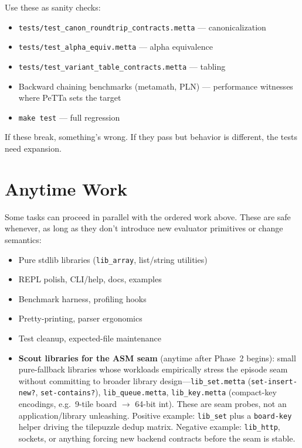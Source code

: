 \documentclass[11pt]{article}
\newcommand{\code}[1]{\texttt{#1}}
\newcommand{\PeTTa}{\textup{PeTTa}}
\begin{document}
Use these as sanity checks:
\begin{itemize}
\item \code{tests/test\_canon\_roundtrip\_contracts.metta} --- canonicalization
\item \code{tests/test\_alpha\_equiv.metta} --- alpha equivalence
\item \code{tests/test\_variant\_table\_contracts.metta} --- tabling
\item Backward chaining benchmarks (metamath, PLN) --- performance witnesses
  where \PeTTa{} sets the target
\item \code{make test} --- full regression
\end{itemize}

If these break, something's wrong.  If they pass but behavior is
different, the tests need expansion.

\section{Anytime Work}

Some tasks can proceed in parallel with the ordered work above.
These are safe whenever, as long as they don't introduce new
evaluator primitives or change semantics:

\begin{itemize}
\item Pure stdlib libraries (\code{lib\_array}, list/string utilities)
\item REPL polish, CLI/help, docs, examples
\item Benchmark harness, profiling hooks
\item Pretty-printing, parser ergonomics
\item Test cleanup, expected-file maintenance
\item \textbf{Scout libraries for the ASM seam} (anytime after
  Phase~2 begins): small pure-fallback libraries whose workloads
  empirically stress the episode seam without committing to broader
  library design---\code{lib\_set.metta} (\code{set-insert-new?},
  \code{set-contains?}), \code{lib\_queue.metta},
  \code{lib\_key.metta} (compact-key encodings, e.g.\ 9-tile board
  $\rightarrow$ 64-bit int).  These are seam probes, not an
  application/library unleashing.  Positive example: \code{lib\_set}
  plus a \code{board-key} helper driving the tilepuzzle dedup matrix.
  Negative example: \code{lib\_http}, sockets, or anything forcing
  new backend contracts before the seam is stable.
\end{itemize}
\end{document}
